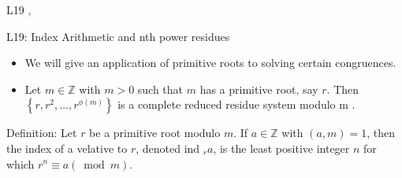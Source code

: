 \documentclass[10pt]{article}
\begin{document}
L19 ,

L19: Index Arithmetic and nth power residues

\begin{itemize}
  \item We will give an application of primitive roots to solving certain congruences.
  \item Let $m \in \mathbb{Z}$ with $m>0$ such that $m$ has a primitive root, say $r$. Then $\left\{r, r^{2}, \ldots, r^{\phi(m)}\right\}$ is a complete reduced residue system modulo m .
\end{itemize}

Definition: Let $r$ be a primitive root modulo $m$. If $a \in \mathbb{Z}$ with $(a, m)=1$, then the index of a velative to $r$, denoted ind ${ }_{r} a$, is the least positive integer $n$ for which $r^{n} \equiv a(\bmod m)$.
\end{document}
